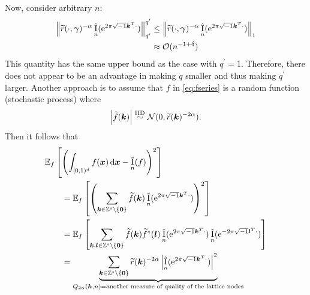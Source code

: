 \documentclass{iitthesis-au} %
\newcommand{\tr}{\widetilde{r}}
\newcommand{\appxintn}{\appxint_n}
\DeclareMathOperator{\appxint}{\hat{I}}
\newcommand{\onetos}{1\!:\!s}
\newcommand{\LarysaNote}[1]{{\color{violet}#1}}
\begin{document}
Now, consider arbitrary $n$:
\begin{align*}
    \norm[q'] {\tr(\cdot,\vgamma)^{-\alpha} \appxint_n(\me^{2 \pi \sqrt{-1} \vk^T \cdot})}^{q'} 
    &\leq  \norm[1] {\tr(\cdot,\vgamma)^{-\alpha} \appxint_n(\me^{2 \pi \sqrt{-1} \vk^T \cdot})} \\ 
    &  \approx \Order(n^{-1+\delta}) %
\end{align*}
This quantity has the same upper bound as the case with $q^{'} = 1$. Therefore, there does not appear to be an advantage in making $q$ smaller and thus making $q^{'}$ larger. 
Another approach is to assume that $f$ in \eqref{eq:fseries} is a random function (stochastic process) where
\begin{equation}
    \abs{\tf(\vk)} \IIDsim \cn(0,\tr(\vk)^{-2\alpha}).
\end{equation}
Then it follows that
\begin{align*}
    \MoveEqLeft{\Ex_f\left[\left(\int_{[0,1)^d} f(\vx) \, \dif \vx - \appxintn(f) \right)^2\right]} \\
    & =
    \Ex_f\left[\left(\sum_{\vk \in \integers^s \setminus\{\vzero\}} \tf(\vk) \appxintn(\me^{2 \pi \sqrt{-1} \vk^T \cdot})\right)^2\right] \\
     & =
    \Ex_f\left[\sum_{\vk,\vl \in \integers^s \setminus\{\vzero\}} \tf(\vk) \tf^*(\vl) \appxintn(\me^{2 \pi \sqrt{-1} \vk^T \cdot}) \appxintn(\me^{-2 \pi \sqrt{-1} \vl^T \cdot})\right] \\
    & = \underbrace{\sum_{\vk\in \integers^s \setminus\{\vzero\}} \tr(\vk)^{-2\alpha} \abs{\appxintn(\me^{2 \pi \sqrt{-1} \vk^T \cdot})}^2}_{Q_{2\alpha}(\vh,n) = \text{another measure of quality of the lattice nodes}}  \\
\end{align*}
\end{document}
